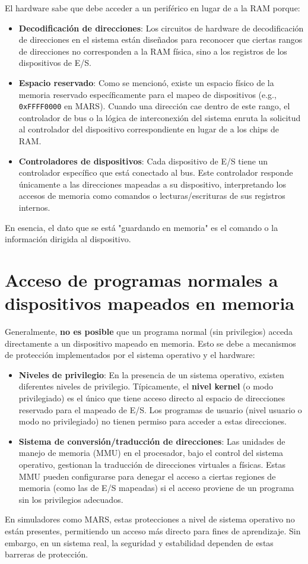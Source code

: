 \documentclass{article}
\begin{document}
	El hardware sabe que debe acceder a un periférico en lugar de a la RAM porque:
	\begin{itemize}
		\item \textbf{Decodificación de direcciones}: Los circuitos de hardware de decodificación de direcciones en el sistema están diseñados para reconocer que ciertas rangos de direcciones no corresponden a la RAM física, sino a los registros de los dispositivos de E/S.
		\item \textbf{Espacio reservado}: Como se mencionó, existe un espacio físico de la memoria reservado específicamente para el mapeo de dispositivos (e.g., \texttt{0xFFFF0000} en MARS). Cuando una dirección cae dentro de este rango, el controlador de bus o la lógica de interconexión del sistema enruta la solicitud al controlador del dispositivo correspondiente en lugar de a los chips de RAM.
		\item \textbf{Controladores de dispositivos}: Cada dispositivo de E/S tiene un controlador específico que está conectado al bus. Este controlador responde únicamente a las direcciones mapeadas a su dispositivo, interpretando los accesos de memoria como comandos o lecturas/escrituras de sus registros internos.
	\end{itemize}
	En esencia, el dato que se está "guardando en memoria" es el comando o la información dirigida al dispositivo.
	
	\section{Acceso de programas normales a dispositivos mapeados en memoria}
	
	Generalmente, \textbf{no es posible} que un programa normal (sin privilegios) acceda directamente a un dispositivo mapeado en memoria. Esto se debe a mecanismos de protección implementados por el sistema operativo y el hardware:
	\begin{itemize}
		\item \textbf{Niveles de privilegio}: En la presencia de un sistema operativo, existen diferentes niveles de privilegio. Típicamente, el \textbf{nivel kernel} (o modo privilegiado) es el único que tiene acceso directo al espacio de direcciones reservado para el mapeado de E/S. Los programas de usuario (nivel usuario o modo no privilegiado) no tienen permiso para acceder a estas direcciones.
		\item \textbf{Sistema de conversión/traducción de direcciones}: Las unidades de manejo de memoria (MMU) en el procesador, bajo el control del sistema operativo, gestionan la traducción de direcciones virtuales a físicas. Estas MMU pueden configurarse para denegar el acceso a ciertas regiones de memoria (como las de E/S mapeadas) si el acceso proviene de un programa sin los privilegios adecuados.
	\end{itemize}
	En simuladores como MARS, estas protecciones a nivel de sistema operativo no están presentes, permitiendo un acceso más directo para fines de aprendizaje. Sin embargo, en un sistema real, la seguridad y estabilidad dependen de estas barreras de protección.
	
\end{document}
